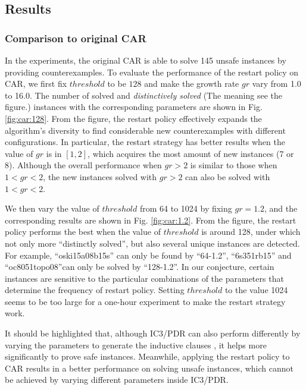 \subsection{Results}

\subsubsection{Comparison to original CAR}
In the experiments, the original CAR is able to solve 145 unsafe instances by providing counterexamples.
To evaluate the performance of the restart policy on CAR, we first fix $threshold$ to be $128$ and make the growth rate $gr$ vary from 1.0 to 16.0. The number of solved and \emph{distinctively solved} (The meaning see the figure.) instances with the corresponding parameters are shown in Fig. \ref{fig:car:128}. From the figure, the restart policy effectively expands the algorithm's diversity to find considerable new counterexamples with different configurations. In particular, the restart strategy has better results when the value of $gr$ is in $[1, 2]$, which acquires the most amount of new instances (7 or 8). Although the overall performance when $gr>2$ is similar to those when $1<gr<2$, the new instances solved with $gr>2$ can also be solved with $1<gr<2$. 


We then vary the value of $threshold$ from 64 to 1024 by fixing $gr=1.2$, and the corresponding results are shown in 
Fig. \ref{fig:car:1.2}. From the figure, the restart policy performs the best when the value of $threshold$ is around 128, under which not only more ``distinctly solved'', but also several unique instances are detected. For example, ``oski15a08b15s'' can only be found by ``64-1.2'', ``6s351rb15'' and ``oc8051topo08''can only be solved by ``128-1.2''. In our conjecture, certain instances are sensitive to the particular combinations of the parameters that determine the frequency of restart policy. Setting $threshold$ to the value 1024 seems to be too large for a one-hour experiment to make the restart strategy work. 

It should be highlighted that, although IC3/PDR can also perform differently by varying the parameters to generate the inductive clauses \cite{GR16}, it helps more significantly to prove safe instances. Meanwhile, applying the restart policy to CAR results in a better performance on solving unsafe instances, which cannot be achieved by varying different parameters inside IC3/PDR. 

